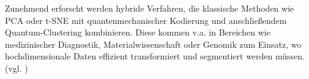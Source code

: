 Zunehmend erforscht werden hybride Verfahren, die klassische Methoden wie PCA oder t-SNE mit quantenmechanischer Kodierung und anschließendem Quantum-Clustering kombinieren. Diese kommen v.a. in Bereichen wie medizinischer Diagnostik, Materialwissenschaft oder Genomik zum Einsatz, wo hochdimensionale Daten effizient transformiert und segmentiert werden müssen. (vgl. \cite{gujjuQuantumMachineLearning2024})



%
